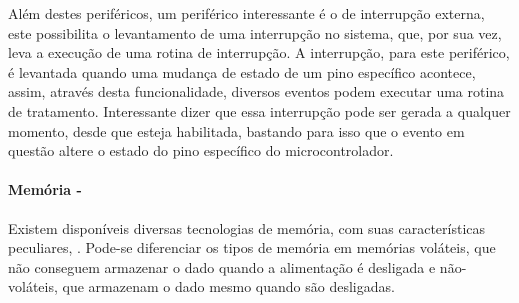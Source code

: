 Além destes periféricos, um periférico interessante é o de interrupção externa, este possibilita o levantamento de uma interrupção no sistema, que, por sua vez, leva a execução de uma rotina de interrupção. A interrupção, para este periférico, é levantada quando uma mudança de estado de um pino específico acontece, assim, através desta funcionalidade, diversos eventos podem executar uma rotina de tratamento. Interessante dizer que essa interrupção pode ser gerada a qualquer momento, desde que esteja habilitada, bastando para isso que o evento em questão altere o estado do pino específico do microcontrolador.

\paragraph{\textbf{Memória -}}
Existem disponíveis diversas tecnologias de memória, com suas características peculiares, \cite[p.~74-79]{Steve2003}. Pode-se diferenciar os tipos de memória em memórias voláteis, que não conseguem armazenar o dado quando a alimentação é desligada e não-voláteis, que armazenam o dado mesmo quando são desligadas.
